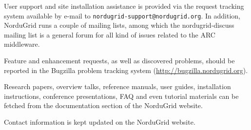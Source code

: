 \documentclass{article}                            %
\begin{document}
User support and site installation assistance is provided via the
request tracking system available by e-mail to
\texttt{nordugrid-support@nordugrid.org}.
In addition, NorduGrid runs a couple of mailing lists, among which the
nordugrid-discuss mailing list is a general forum for all kind of
issues related to the ARC middleware.

Feature and enhancement requests, as well as discovered problems, should be
reported in the Bugzilla problem tracking system
(\url{http://bugzilla.nordugrid.org}).

Research papers, overview talks, reference manuals, user guides,
installation instructions, conference presentations, FAQ and even
tutorial materials can be fetched from the documentation section of the
NorduGrid website.

Contact information is kept updated on the NorduGrid website.


\end{document}
